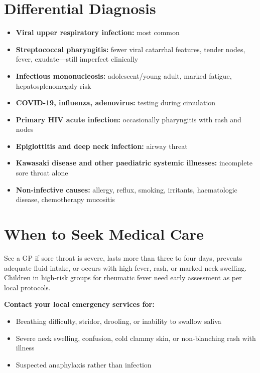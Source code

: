 \section*{Differential Diagnosis}
\begin{itemize}
    \item \textbf{Viral upper respiratory infection:} most common
    \item \textbf{Streptococcal pharyngitis:} fewer viral catarrhal features, tender nodes, fever, exudate---still imperfect clinically
    \item \textbf{Infectious mononucleosis:} adolescent/young adult, marked fatigue, hepatosplenomegaly risk
    \item \textbf{COVID-19, influenza, adenovirus:} testing during circulation
    \item \textbf{Primary HIV acute infection:} occasionally pharyngitis with rash and nodes
    \item \textbf{Epiglottitis and deep neck infection:} airway threat
    \item \textbf{Kawasaki disease and other paediatric systemic illnesses:} incomplete sore throat alone
    \item \textbf{Non-infective causes:} allergy, reflux, smoking, irritants, haematologic disease, chemotherapy mucositis
\end{itemize}

\section*{When to Seek Medical Care}
See a GP if sore throat is severe, lasts more than three to four days, prevents adequate fluid intake, or occurs with high fever, rash, or marked neck swelling. Children in high-risk groups for rheumatic fever need early assessment as per local protocols.

\textbf{Contact your local emergency services for:}
\begin{itemize}
    \item Breathing difficulty, stridor, drooling, or inability to swallow saliva
    \item Severe neck swelling, confusion, cold clammy skin, or non-blanching rash with illness
    \item Suspected anaphylaxis rather than infection
\end{itemize}

